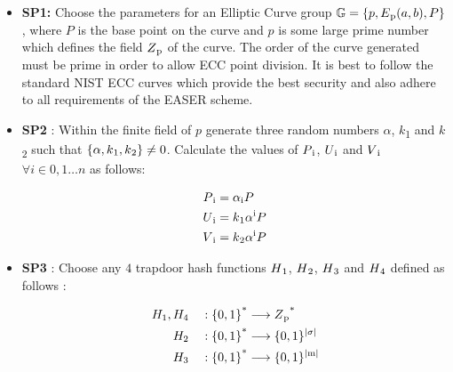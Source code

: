 \documentclass[conference]{IEEEtran}
\begin{document}
\begin{itemize}
\item{\bf SP1:} Choose the parameters for an Elliptic Curve group $\mathbb{G} = \{p, E\textsubscript{p}(a, b), P\}$, where $P$ is the base point on the curve and $p$ is some large prime number which defines the field $Z\textsubscript{p}$ of the curve. The order of the curve generated must be prime in order to allow ECC point division. It is best to follow the standard NIST ECC curves which provide the best security and also adhere to all requirements of the EASER scheme.

\item{\bf SP2} : Within the finite field of $p$ generate three random numbers $\alpha$, $k$\textsubscript{1} and $k$\textsubscript{2} such that $\{\alpha, k\textsubscript{1}, k\textsubscript{2}\} \neq0$. Calculate the values of $P\textsubscript{i}$, $U\textsubscript{i}$ and $V\textsubscript{i}$ $\forall i \in 0,1\ldots  n$ as follows:
\begin{ceqn}
\begin{align}
P\textsubscript{i} &= \alpha\textsubscript{i}P \\
U\textsubscript{i} &= k\textsubscript{1}\alpha\textsuperscript{i}P \\
V\textsubscript{i} &= k\textsubscript{2}\alpha\textsuperscript{i}P
\end{align}
\end{ceqn}

\item{\bf SP3} : Choose any $4$ trapdoor hash functions $H\textsubscript{1}$, $H\textsubscript{2}$, $H\textsubscript{3}$ and $H\textsubscript{4}$ defined as follows :
\begin{ceqn}
\begin{align}
H_1,H_4 \quad&: \{0, 1\}\textsuperscript{*}\longrightarrow Z\textsubscript{p}\textsuperscript{*} \\
H_2 \quad&: \{0, 1\}\textsuperscript{*}\longrightarrow \{0, 1\}\textsuperscript{$\mid$$\sigma$$\mid$} \\
H_3 \quad&: \{0, 1\}\textsuperscript{*}\longrightarrow \{0, 1\}\textsuperscript{$\mid$m$\mid$}
\end{align}
\end{ceqn}


\end{itemize}
\end{document}
